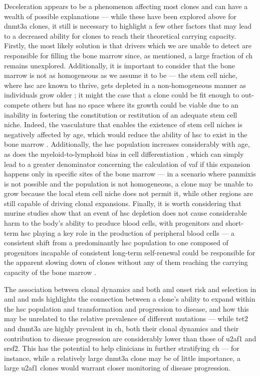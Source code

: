 Deceleration appears to be a phenomenon affecting most clones and can have a wealth of possible explanations --- while these have been explored above for \ac{dnmt3a} clones, it still is necessary to highlight a few other factors that may lead to a decreased ability for clones to reach their theoretical carrying capacity. Firstly, the most likely solution is that drivers which we are unable to detect are responsible for filling the bone marrow since, as mentioned, a large fraction of \ac{ch} remains unexplored. Additionally, it is important to consider that the bone marrow is not as homogeneous as we assume it to be --- the stem cell niche, where \ac{hsc} are known to thrive, gets depleted in a non-homogeneous manner as individuals grow older \cite{Crane2017-hl}; it might the case that a clone could be fit enough to out-compete others but has no space where its growth could be viable due to an inability in fostering the constitution or restitution of an adequate stem cell niche. Indeed, the vasculature that enables the existence of stem cell niches is negatively affected by age, which would reduce the ability of \ac{hsc} to exist in the bone marrow \cite{Tanaka2017-pu,Wang2017-rg}. Additionally, the \ac{hsc} population increases considerably with age, as does the myeloid-to-lymphoid bias in cell differentiation \cite{Pang2011-dw}, which can simply lead to a greater denominator concerning the calculation of \ac{vaf} if this expansion happens only in specific sites of the bone marrow --- in a scenario where panmixis is not possible and the population is not homogeneous, a clone may be unable to grow because the local stem cell niche does not permit it, while other regions are still capable of driving clonal expansions. Finally, it is worth considering that murine studies show that an event of \ac{hsc} depletion does not cause considerable harm to the body's ability to produce blood cells, with progenitors and short-term \ac{hsc} playing a key role in the production of peripheral blood cells --- a consistent shift from a predominantly \ac{hsc} population to one composed of progenitors incapable of consistent long-term self-renewal could be responsible for the apparent slowing down of clones without any of them reaching the carrying capacity of the bone marrow \cite{Schoedel2016-bi,Mitchell2021-zl}.

The association between clonal dynamics and both \ac{aml} onset risk and selection in \ac{aml} and \ac{mds} highlights the connection between a clone's ability to expand within the \ac{hsc} population and transformation and progression to disease, and how this may be unrelated to the relative prevalence of different mutations --- while \ac{tet2} and \ac{dnmt3a} are highly prevalent in \ac{ch}, both their clonal dynamics and their contribution to disease progression are considerably lower than those of \ac{u2af1} and \ac{srsf2}. This has the potential to help clinicians in further stratifying \ac{ch} --- for instance, while a relatively large \ac{dnmt3a} clone may be of little importance, a large \ac{u2af1} clones would warrant closer monitoring of disease progression.

